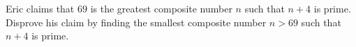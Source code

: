 Eric claims that $69$ is the greatest composite number $n$ such that $n+4$ is prime. Disprove his claim by finding the smallest composite number $n>69$ such that $n+4$ is prime.
